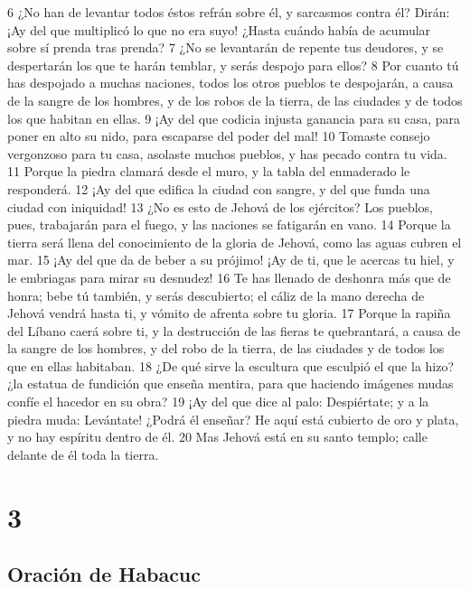 6 ¿No han de levantar todos éstos refrán sobre él, y sarcasmos contra él? Dirán: ¡Ay del que multiplicó lo que no era suyo! ¿Hasta cuándo había de acumular sobre sí prenda tras prenda?
7 ¿No se levantarán de repente tus deudores, y se despertarán los que te harán temblar, y serás despojo para ellos?
8 Por cuanto tú has despojado a muchas naciones, todos los otros pueblos te despojarán, a causa de la sangre de los hombres, y de los robos de la tierra, de las ciudades y de todos los que habitan en ellas.
9 ¡Ay del que codicia injusta ganancia para su casa, para poner en alto su nido, para escaparse del poder del mal!
10 Tomaste consejo vergonzoso para tu casa, asolaste muchos pueblos, y has pecado contra tu vida.
11 Porque la piedra clamará desde el muro, y la tabla del enmaderado le responderá.
12 ¡Ay del que edifica la ciudad con sangre, y del que funda una ciudad con iniquidad!
13 ¿No es esto de Jehová de los ejércitos? Los pueblos, pues, trabajarán para el fuego, y las naciones se fatigarán en vano.
14 Porque la tierra será llena del conocimiento de la gloria de Jehová, como las aguas cubren el mar. 
15 ¡Ay del que da de beber a su prójimo! ¡Ay de ti, que le acercas tu hiel, y le embriagas para mirar su desnudez!
16 Te has llenado de deshonra más que de honra; bebe tú también, y serás descubierto; el cáliz de la mano derecha de Jehová vendrá hasta ti, y vómito de afrenta sobre tu gloria.
17 Porque la rapiña del Líbano caerá sobre ti, y la destrucción de las fieras te quebrantará, a causa de la sangre de los hombres, y del robo de la tierra, de las ciudades y de todos los que en ellas habitaban.
18 ¿De qué sirve la escultura que esculpió el que la hizo? ¿la estatua de fundición que enseña mentira, para que haciendo imágenes mudas confíe el hacedor en su obra?
19 ¡Ay del que dice al palo: Despiértate; y a la piedra muda: Levántate! ¿Podrá él enseñar? He aquí está cubierto de oro y plata, y no hay espíritu dentro de él.
20 Mas Jehová está en su santo templo; calle delante de él toda la tierra.

\chapter{3}

\section*{Oración de Habacuc}

